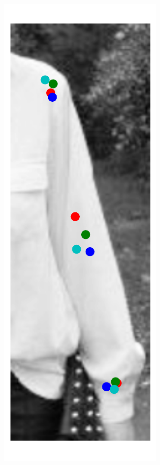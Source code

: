 \begin{figure}[t!]
\begin{subfigure}[b]{0.05\textwidth}
    \end{subfigure}
  	\hfill
    \begin{subfigure}[b]{0.05\textwidth}
            \includegraphics[width=\textwidth]{resources/Fig_Variance/image_2}

\end{subfigure}
\end{figure}
